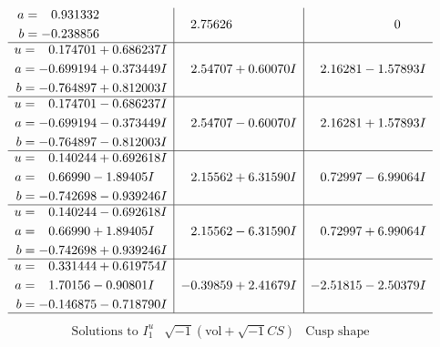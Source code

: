 \documentclass[1p]{elsarticle_modified}
\theoremstyle{definition}
\newcommand{\I}{\sqrt{-1}}
\begin{document}
$$\begin{array}{c|c|c}
\begin{aligned}
a &= \phantom{-}0.931332\phantom{ +0.000000I} \\
b &= -0.238856\phantom{ +0.000000I}\end{aligned}
 & \phantom{-}2.75626\phantom{ +0.000000I} & \phantom{-0.000000 } 0 \\ \hline\begin{aligned}
u &= \phantom{-}0.174701 + 0.686237 I \\
a &= -0.699194 + 0.373449 I \\
b &= -0.764897 + 0.812003 I\end{aligned}
 & \phantom{-}2.54707 + 0.60070 I & \phantom{-}2.16281 - 1.57893 I \\ \hline\begin{aligned}
u &= \phantom{-}0.174701 - 0.686237 I \\
a &= -0.699194 - 0.373449 I \\
b &= -0.764897 - 0.812003 I\end{aligned}
 & \phantom{-}2.54707 - 0.60070 I & \phantom{-}2.16281 + 1.57893 I \\ \hline\begin{aligned}
u &= \phantom{-}0.140244 + 0.692618 I \\
a &= \phantom{-}0.66990 - 1.89405 I \\
b &= -0.742698 - 0.939246 I\end{aligned}
 & \phantom{-}2.15562 + 6.31590 I & \phantom{-}0.72997 - 6.99064 I \\ \hline\begin{aligned}
u &= \phantom{-}0.140244 - 0.692618 I \\
a &= \phantom{-}0.66990 + 1.89405 I \\
b &= -0.742698 + 0.939246 I\end{aligned}
 & \phantom{-}2.15562 - 6.31590 I & \phantom{-}0.72997 + 6.99064 I \\ \hline\begin{aligned}
u &= \phantom{-}0.331444 + 0.619754 I \\
a &= \phantom{-}1.70156 - 0.90801 I \\
b &= -0.146875 - 0.718790 I\end{aligned}
 & -0.39859 + 2.41679 I & -2.51815 - 2.50379 I\\
 \hline 
 \end{array}$$\newpage$$\begin{array}{c|c|c}  
\text{Solutions to }I^u_{1}& \I (\text{vol} + \sqrt{-1}CS) & \text{Cusp shape}\\
 \hline 
\begin{aligned}

\end{aligned}
\end{array}$$
\end{document}

